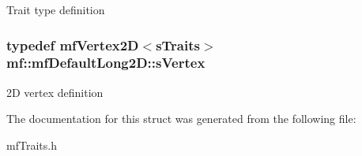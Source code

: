 \label{structmf_1_1mfDefaultLong2D_abfeb7f123426df4ccc4af7c4ee294680}
Trait type definition \hypertarget{structmf_1_1mfDefaultLong2D_a240fc233dce3b1468d48d55d770cfdb6}{
\subsubsection[{sVertex}]{\setlength{\rightskip}{0pt plus 5cm}typedef {\bf mfVertex2D}$<${\bf sTraits}$>$ {\bf mf::mfDefaultLong2D::sVertex}}}
\label{structmf_1_1mfDefaultLong2D_a240fc233dce3b1468d48d55d770cfdb6}
2D vertex definition 

The documentation for this struct was generated from the following file:\begin{DoxyCompactItemize}
\item 
mfTraits.h\end{DoxyCompactItemize}
